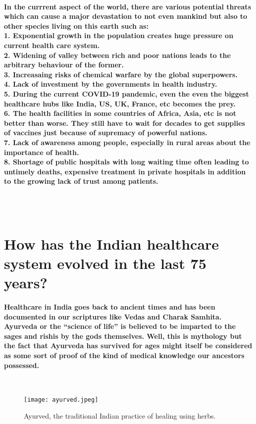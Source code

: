 \documentclass[12pt]{article}
\begin{document}
    \paragraph{In the currrent aspect of the world, there are various potential threats which can cause a major devastation to not even mankind but also to other species living on this earth such as:
    \\\textbf{1.}   Exponential growth in the population creates huge pressure on current health care system.
    \\\textbf{2.}   Widening of valley between rich and poor nations leads to the arbitrary behaviour of the former.
    \\\textbf{3.}   Increasaing risks of chemical warfare by the global superpowers.
    \\\textbf{4.}   Lack of investment by the governments in health industry.
    \\\textbf{5.}   During the current COVID-19 pandemic, even the even the biggest healthcare hubs like India, US, UK, France, etc becomes the prey.
    \\\textbf{6.}   The health facilities in some countries of Africa, Asia, etc is not better than worse. They still have to wait for decades to get supplies of vaccines just because of supremacy of powerful nations.
    \\\textbf{7.}   Lack of awareness among people, especially in rural areas about the importance of health.
    \\\textbf{8.}   Shortage of public hospitals with long waiting time often leading to untimely deaths, expensive treatment in private hospitals in addition to the growing lack of trust among patients.}
   
    \\\\\section{\textbf{How has the Indian healthcare system evolved in the last 75 years?}}
    \paragraph{Healthcare in India goes back to ancient times and has been documented in our scriptures like Vedas and Charak Samhita. Ayurveda or the “science of life” is believed to be imparted to the sages and rishis by the gods themselves. Well, this is mythology but the fact that Ayurveda has survived for ages might itself be considered as some sort of proof of the kind of medical knowledge our ancestors possessed.}\\
       \begin{figure}[h]
       	\texttt{[image: ayurved.jpeg]}
       	\caption{Ayurved, the traditional Indian practice of healing using herbs.}
       \end{figure}
\end{document}
